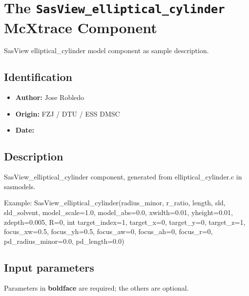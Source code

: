 \section{The \texttt{SasView\_elliptical\_cylinder} McXtrace Component}
SasView elliptical\_cylinder model component as sample description.

\subsection*{Identification}
\begin{itemize}
  \item \textbf{Author:} Jose Robledo
  \item \textbf{Origin:} FZJ / DTU / ESS DMSC
  \item \textbf{Date:} 
\end{itemize}

\subsection*{Description}
SasView\_elliptical\_cylinder component, generated from elliptical\_cylinder.c in sasmodels.

Example: SasView\_elliptical\_cylinder(radius\_minor, r\_ratio, length, sld, sld\_solvent, model\_scale=1.0, model\_abs=0.0, xwidth=0.01, yheight=0.01, zdepth=0.005, R=0, int target\_index=1, target\_x=0, target\_y=0, target\_z=1, focus\_xw=0.5, focus\_yh=0.5, focus\_aw=0, focus\_ah=0, focus\_r=0, pd\_radius\_minor=0.0, pd\_length=0.0)

\subsection*{Input parameters}
Parameters in \textbf{boldface} are required; the others are optional.

